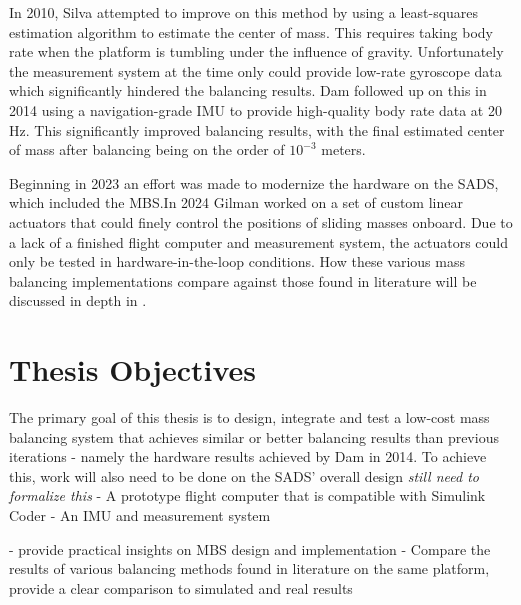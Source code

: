 In 2010, Silva attempted to improve on this method by using a least-squares estimation algorithm to estimate the center of mass. This requires taking body rate when the platform is tumbling under the influence of gravity. Unfortunately the measurement system at the time only could provide low-rate gyroscope data which significantly hindered the balancing results. Dam followed up on this in 2014 using a navigation-grade IMU to provide high-quality body rate data at 20 Hz. This significantly improved balancing results, with the final estimated center of mass after balancing being on the order of $10^{-3}$ meters.

Beginning in 2023 an effort was made to modernize the hardware on the SADS, which included the MBS.\@ In 2024 Gilman worked on a set of custom linear actuators that could finely control the positions of sliding masses onboard. Due to a lack of a finished flight computer and measurement system, the actuators could only be tested in hardware-in-the-loop conditions. How these various mass balancing implementations compare against those found in literature will be discussed in depth in . 


\section{Thesis Objectives}

The primary goal of this thesis is to design, integrate and test a low-cost mass balancing system that achieves similar or better balancing results than previous iterations - namely the hardware results achieved by Dam in 2014. To achieve this, work will also need to be done on the SADS' overall design \textit{still need to formalize this}
- A prototype flight computer that is compatible with Simulink Coder
- An IMU and measurement system

- provide practical insights on MBS design and implementation
- Compare the results of various balancing methods found in literature on the same platform, provide a clear comparison to simulated and real results

